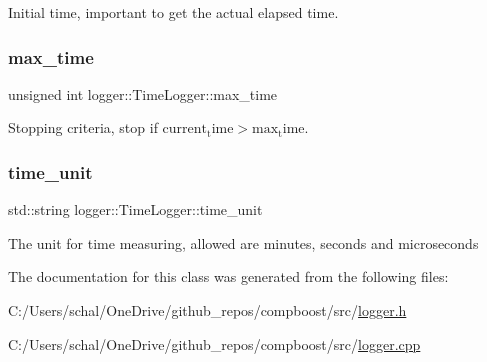 Initial time, important to get the actual elapsed time. 

\mbox{\label{classlogger_1_1_time_logger_a48ea18ddd1f44f11ad52448cfde37e63}} 
\subsubsection{\texorpdfstring{max\+\_\+time}{max\_time}}
{\footnotesize\ttfamily unsigned int logger\+::\+Time\+Logger\+::max\+\_\+time\hspace{0.3cm}{\ttfamily [private]}}



Stopping criteria, stop if $\mathrm{current_time} > \mathrm{max_time}$. 

\mbox{\label{classlogger_1_1_time_logger_ab5a6998dea294708d1d393b2b2f240bb}} 
\subsubsection{\texorpdfstring{time\+\_\+unit}{time\_unit}}
{\footnotesize\ttfamily std\+::string logger\+::\+Time\+Logger\+::time\+\_\+unit\hspace{0.3cm}{\ttfamily [private]}}



The unit for time measuring, allowed are {\ttfamily minutes}, {\ttfamily seconds} and {\ttfamily microseconds} 



The documentation for this class was generated from the following files\+:\begin{DoxyCompactItemize}
\item 
C\+:/\+Users/schal/\+One\+Drive/github\+\_\+repos/compboost/src/\mbox{\hyperlink{logger_8h}{logger.\+h}}\item 
C\+:/\+Users/schal/\+One\+Drive/github\+\_\+repos/compboost/src/\mbox{\hyperlink{logger_8cpp}{logger.\+cpp}}\end{DoxyCompactItemize}
